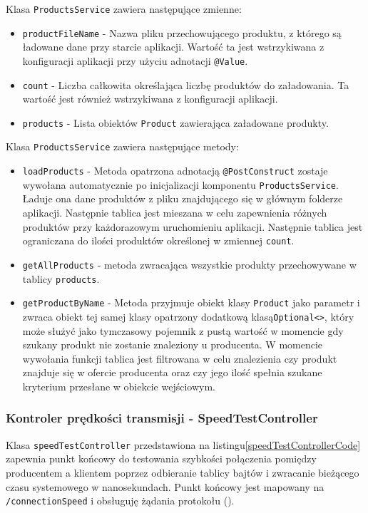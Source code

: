 Klasa \verb|ProductsService| zawiera następujące zmienne:
\begin{itemize}
    \item \verb|productFileName| - Nazwa pliku przechowującego produktu, z którego są ładowane dane przy starcie aplikacji. Wartość ta jest wstrzykiwana z konfiguracji aplikacji przy użyciu adnotacji \verb|@Value|.
    \item \verb|count| -  Liczba całkowita określająca liczbę produktów do załadowania. Ta wartość jest również wstrzykiwana z konfiguracji aplikacji.
    \item \verb|products| - Lista obiektów \verb|Product| zawierająca załadowane produkty.
\end{itemize}

Klasa \verb|ProductsService| zawiera następujące metody:
\begin{itemize}
    \item \verb|loadProducts| - Metoda opatrzona adnotacją \verb|@PostConstruct| zostaje wywołana automatycznie po inicjalizacji komponentu \verb|ProductsService|. Ładuje ona dane produktów z pliku znajdującego się w głównym folderze aplikacji. Następnie tablica jest mieszana w celu zapewnienia różnych produktów przy każdorazowym uruchomieniu aplikacji. Następnie tablica jest ograniczana do ilości produktów określonej w zmiennej \verb|count|.
    \item \verb|getAllProducts| - metoda zwracająca wszystkie produkty przechowywane w tablicy \verb|products|.
    \item \verb|getProductByName| - Metoda przyjmuje obiekt klasy \verb|Product| jako parametr i zwraca obiekt tej samej klasy opatrzony dodatkową klasą\verb|Optional<>|, który może służyć jako tymczasowy pojemnik z pustą wartość w momencie gdy szukany produkt nie zostanie znaleziony u producenta. W momencie wywołania funkcji tablica jest filtrowana w celu znalezienia czy produkt znajduje się w ofercie producenta oraz czy jego ilość spełnia szukane kryterium przesłane w obiekcie wejściowym.
\end{itemize}

\subsubsection{Kontroler prędkości transmisji - SpeedTestController}

Klasa \verb|speedTestController| przedstawiona na listingu\ref{speedTestControllerCode} zapewnia punkt końcowy do testowania szybkości połączenia pomiędzy producentem a klientem poprzez odbieranie tablicy bajtów i zwracanie bieżącego czasu systemowego w nanosekundach. Punkt końcowy jest mapowany na \verb|/connectionSpeed| i obsługuję żądania  protokołu  ().


